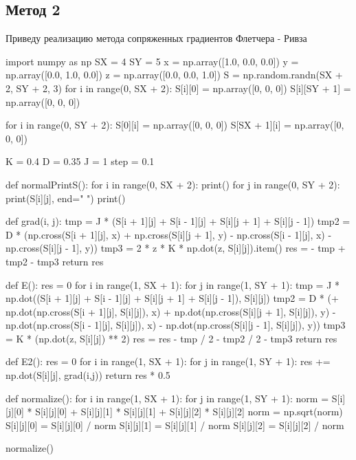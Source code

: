 \documentclass[ 12pt,x11names]{article}
\begin{document}
\subsection{Метод 2}
 Приведу реализацию метода сопряженных градиентов Флетчера - Ривза
 \begin{python}
 import numpy as np
SX = 4
SY = 5
x = np.array([1.0, 0.0, 0.0])
y = np.array([0.0, 1.0, 0.0])
z = np.array([0.0, 0.0, 1.0])
S = np.random.randn(SX + 2, SY + 2, 3)
for i in range(0, SX + 2):
    S[i][0] = np.array([0, 0, 0])
    S[i][SY + 1] = np.array([0, 0, 0])

for i in range(0, SY + 2):
    S[0][i] = np.array([0, 0, 0])
    S[SX + 1][i] = np.array([0, 0, 0])

K = 0.4
D = 0.35
J = 1
step = 0.1

def normalPrintS():
    for i in range(0, SX + 2):
        print()
        for j in range(0, SY + 2):
            print(S[i][j], end=" ")
    print()


def grad(i, j):
    tmp = J * (S[i + 1][j] + S[i - 1][j] +
        S[i][j + 1] + S[i][j - 1])
    tmp2 = D * (np.cross(S[i + 1][j], x) +
    np.cross(S[i][j + 1], y) -
    np.cross(S[i - 1][j], x) - np.cross(S[i][j - 1], y))
    tmp3 = 2 * z * K * np.dot(z, S[i][j]).item()
    res = - tmp + tmp2 - tmp3
    return res


def E():
    res = 0
    for i in range(1, SX + 1):
        for j in range(1, SY + 1):
            tmp = J * np.dot((S[i + 1][j] + S[i - 1][j] + S[i][j + 1] + S[i][j - 1]), S[i][j])
            tmp2 = D * (+ np.dot(np.cross(S[i + 1][j], S[i][j]), x)
                        + np.dot(np.cross(S[i][j + 1], S[i][j]), y)
                        - np.dot(np.cross(S[i - 1][j], S[i][j]), x)
                        - np.dot(np.cross(S[i][j - 1], S[i][j]), y))
            tmp3 = K * (np.dot(z, S[i][j]) ** 2)
            res = res - tmp / 2 - tmp2 / 2 - tmp3
    return res

def E2():
    res = 0
    for i in range(1, SX + 1):
        for j in range(1, SY + 1):
            res += np.dot(S[i][j], grad(i,j))
    return res * 0.5

def normalize():
    for i in range(1, SX + 1):
        for j in range(1, SY + 1):
            norm = S[i][j][0] * S[i][j][0] + S[i][j][1] * S[i][j][1]
            + S[i][j][2] * S[i][j][2]
            norm = np.sqrt(norm)
            S[i][j][0] = S[i][j][0] / norm
            S[i][j][1] = S[i][j][1] / norm
            S[i][j][2] = S[i][j][2] / norm

normalize()


\end{python}
\end{document}
